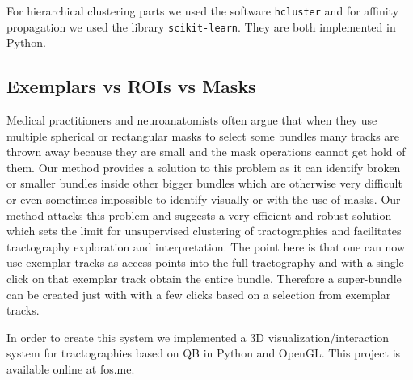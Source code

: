 \documentclass[preprint,authoryear,a4paper,10pt,onecolumn]{elsarticle}
\begin{document}
For hierarchical clustering parts we used the software \texttt{hcluster}
and for affinity propagation we used the library
\texttt{scikit-learn}. They are both implemented in Python.

\subsection{Exemplars vs ROIs vs Masks}

Medical practitioners and neuroanatomists often argue that when they use
multiple spherical or rectangular masks to select some bundles many
tracks are thrown away because they are small and the mask operations
cannot get hold of them. Our method provides a solution to this problem
as it can identify broken or smaller bundles inside other bigger bundles
which are otherwise very difficult or even sometimes impossible to
identify visually or with the use of masks. Our method attacks this
problem and suggests a very efficient and robust solution which sets the
limit for unsupervised clustering of tractographies and facilitates
tractography exploration and interpretation. The point here is that one
can now use exemplar tracks as access points into the full tractography
and with a single click on that exemplar track obtain the entire bundle.
Therefore a super-bundle can be created just with with a few clicks
based on a selection from exemplar tracks.

In order to create this system we implemented a 3D
visualization/interaction system for tractographies based on QB in
Python and OpenGL. This project is available online at fos.me.



\end{document}
